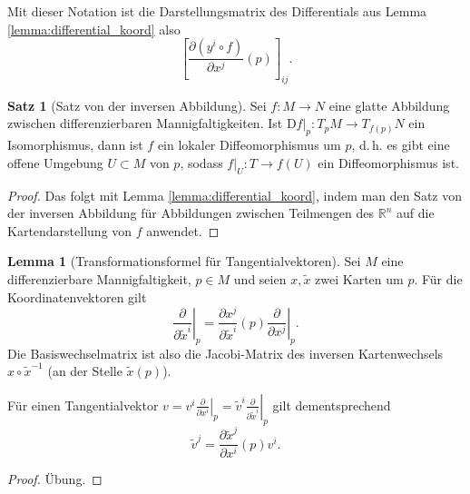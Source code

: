 \documentclass[a4paper]{scrreprt}
\numberwithin{equation}{chapter}
\newcommand{\DD}{\mathrm{D}}
\newcommand{\R}{\mathbb{R}}
\theoremstyle{definition}
\newtheorem{lemma}[defn]{Lemma}
\newtheorem{satz}[defn]{Satz}
\newcommand{\bewUeb}{\begin{proof}Übung.\end{proof}}
\begin{document}
Mit dieser Notation ist die Darstellungsmatrix des Differentials aus Lemma \ref{lemma:differential_koord} also
\[\left[\frac{\partial(y^i \circ f)}{\partial x^j}(p)\right]_{ij}.\]

\begin{satz}[Satz von der inversen Abbildung]
	Sei $f\colon M \to N$ eine glatte Abbildung zwischen differenzierbaren Mannigfaltigkeiten. Ist $\left.\DD f\right|_p\colon T_pM \to T_{f(p)}N$ ein Isomorphismus, dann ist $f$ ein lokaler Diffeomorphismus um $p$, d.\,h. es gibt eine offene Umgebung $U\subset M$ von $p$, sodass $f|_U \colon T \to f(U)$ ein Diffeomorphismus ist.

	\begin{proof}
		Das folgt mit Lemma \ref{lemma:differential_koord}, indem man den Satz von der inversen Abbildung für Abbildungen zwischen Teilmengen des $\R^n$ auf die Kartendarstellung von $f$ anwendet.
	\end{proof}
\end{satz}

\begin{lemma}[Transformationsformel für Tangentialvektoren]
	Sei $M$ eine differenzierbare Mannigfaltigkeit, $p\in M$ und seien $x, \tilde x$ zwei Karten um $p$. Für die Koordinatenvektoren gilt
	\[\left.\frac{\partial}{\partial \tilde x^i}\right|_p = \frac{\partial x^j}{\partial \tilde x^i}(p) \left.\frac{\partial}{\partial x^j}\right|_p.\]
	Die Basiswechselmatrix ist also die Jacobi-Matrix des inversen Kartenwechsels $x \circ \tilde x^{-1}$ (an der Stelle $\tilde x(p)$).

	Für einen Tangentialvektor $v = v^i \left.\frac{\partial}{\partial x^i}\right|_p = \tilde v^i \left.\frac{\partial}{\partial \tilde x^i}\right|_p$ gilt dementsprechend
	\[\tilde v^j = \frac{\partial \tilde x^j}{\partial x^i}(p) v^i.\]

	\bewUeb
\end{lemma}

\end{document}
